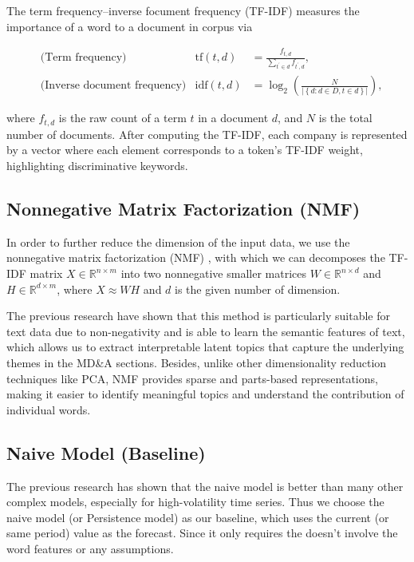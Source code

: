 \documentclass[11pt]{article}
\begin{document}
The term frequency–inverse focument frequency (TF-IDF) \cite{sparck1972statistical}\cite{robertson2004understanding} measures the importance of a word to a document in corpus via

$$
  \begin{aligned}
     & \text{(Term frequency)}             & \mathrm{tf}(t, d)  & = \frac{f_{t, d}}{\sum_{t^\prime \in d} f_{t^\prime, d}},                                     \\
     & \text{(Inverse document frequency)} & \mathrm{idf}(t, d) & = \log_2\left( \frac{N}{\left\vert \left\{ d: d \in D, t \in d \right\} \right\vert} \right),
  \end{aligned}
$$

where $f_{t, d}$ is the raw count of a term $t$ in a document $d$, and $N$ is the total number of documents. After computing the TF-IDF, each company is represented by a vector where each element corresponds to a token's TF-IDF weight, highlighting discriminative keywords.


\subsection{Nonnegative Matrix Factorization (NMF)}

In order to further reduce the dimension of the input data, we use the nonnegative matrix factorization (NMF) \cite{lee2000algorithms} , with which we can decomposes the TF-IDF matrix $X \in \mathbb{R}^{n \times m}$ into two nonnegative smaller matrices $W \in \mathbb{R}^{n \times d}$ and $H \in \mathbb{R}^{d \times m}$, where $X \approx W H$ and $d$ is the given number of dimension.

The previous research \cite{lee1999learning} have shown that this method is particularly suitable for text data due to non-negativity and is able to learn the semantic features of text, which allows us to extract interpretable latent topics that capture the underlying themes in the MD\&A sections. Besides, unlike other dimensionality reduction techniques like PCA, NMF provides sparse and parts-based representations, making it easier to identify meaningful topics and understand the contribution of individual words.

\subsection{Naive Model (Baseline)}

The previous research \cite{beck2025mind} has shown that the naive model is better than many other complex models, especially for high-volatility time series. Thus we choose the naive model (or Persistence model) as our baseline, which uses the current (or same period) value as the forecast. Since it only requires the  doesn't involve the word features or any assumptions.
\end{document}
